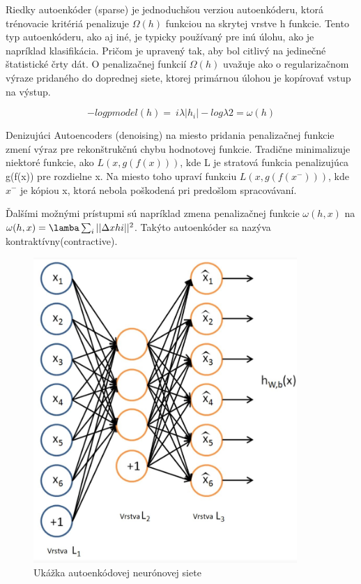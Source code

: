 \hspace{10mm}Riedky autoenkóder (sparse) je jednoduchšou verziou autoenkóderu, ktorá trénovacie kritériá penalizuje \(\Omega(h)\) funkciou na skrytej vrstve h funkcie. Tento typ autoenkóderu, ako aj iné, je typicky používaný pre inú úlohu, ako je napríklad klasifikácia. Pričom je upravený tak, aby bol citlivý na jedinečné štatistické črty dát. O penalizačnej funkcií \(\Omega(h)\) uvažuje ako o regularizačnom výraze pridaného do doprednej siete, ktorej primárnou úlohou je kopírovať vstup na výstup.

\[-log pmodel(h) = \ i\lambda|h_i| - log\lambda2 = \omega(h)\]

\hspace{10mm}Denizujúci Autoencoders (denoising) na miesto pridania penalizačnej funkcie zmení výraz pre rekonštrukčnú chybu hodnotovej funkcie. Tradične minimalizuje niektoré funkcie, ako \(L(x,g(f(x)))\), kde L je stratová funkcia penalizujúca g(f(x)) pre rozdielne x. Na miesto toho upraví funkciu \(L(x,g(f(x^-)))\),  kde \(x^-\) je kópiou x, ktorá nebola poškodená pri predošlom spracovávaní. 

\hspace{10mm}Ďalšími možnými prístupmi sú napríklad zmena penalizačnej funkcie  \(\omega(h,x)\) na \(\omega(h,x) = \lamba\sum_{i}||\Delta xhi||^2\). Takýto autoenkóder sa nazýva kontraktívny(contractive). \cite{Goodfellow-et-al-2016}

\begin{figure}[h!]
\begin{centering}
\includegraphics[width=10cm]{assets/images/234_2.JPG}
\par\end{centering}
\caption{Ukážka autoenkódovej neurónovej  siete \label{fig:ANN}\cite{Autoencoders-tutorial}}
\end{figure}


